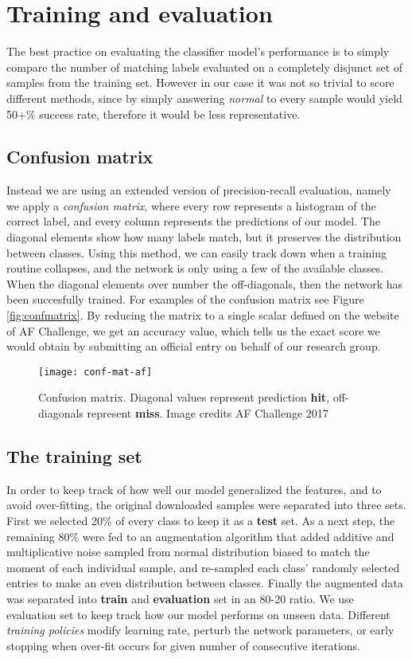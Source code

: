\chapter{Training and evaluation}

The best practice on evaluating the classifier model's performance is to simply compare the number of matching labels evaluated on a completely disjunct set of samples from the training set.
However in our case it was not so trivial to score different methods, since by simply answering \textit{normal} to every sample would yield 50+\% success rate, therefore it would be less representative.

\section{Confusion matrix}
Instead we are using an extended version of precision-recall evaluation, namely we apply a \textit{confusion matrix}, where every row represents a histogram of the correct label, and every column represents the predictions of our model. The diagonal elements show how many labels match, but it preserves the distribution between classes.
Using this method, we can easily track down when a training routine collapses, and the network is only using a few of the available classes. When the diagonal elements over number the off-diagonals, then the network has been succesfully trained. For examples of the confusion matrix see Figure \ref{fig:confmatrix}.
By reducing the matrix to a single scalar defined on the website of AF Challenge, we get an accuracy value, which tells us the exact score we would obtain by submitting an official entry on behalf of our research group.

\begin{figure}
  \centering
  \texttt{[image: conf-mat-af]}
  \caption{Confusion matrix. Diagonal values represent prediction \textbf{hit}, off-diagonals represent \textbf{miss}. Image credits AF Challenge 2017}
  \label{fig:FCN}
\end{figure}

\section{The training set}
In order to keep track of how well our model generalized the features, and to avoid over-fitting, the original downloaded samples were separated into three sets.
First we selected 20\% of every class to keep it as a \textbf{test} set.
As a next step, the remaining 80\% were fed to an augmentation algorithm that added additive and multiplicative noise sampled from normal distribution biased to match the moment of each individual sample, and re-sampled each class' randomly selected entries to make an even distribution between classes.
Finally the augmented data was separated into \textbf{train} and \textbf{evaluation} set in an 80-20 ratio.
We use evaluation set to keep track how our model performs on unseen data.
Different \textit{training policies} modify learning rate, perturb the network parameters, or early stopping when over-fit occurs for given number of consecutive iterations.

